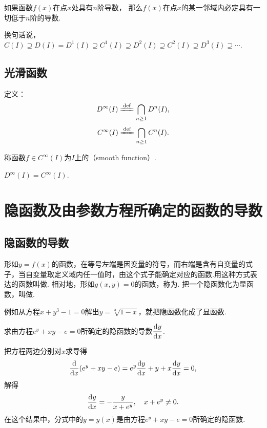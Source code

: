 \begin{theorem}
如果函数\(f(x)\)在点\(x\)处具有\(n\)阶导数，
那么\(f(x)\)在点\(x\)的某一邻域内必定具有一切低于\(n\)阶的导数.
\end{theorem}
换句话说，\(
C(I) \supseteq
D(I) = D^1(I) \supseteq
C^1(I) \supseteq
D^2(I) \supseteq
C^2(I) \supseteq
D^3(I) \supseteq
\dotsb
\).

\subsection{光滑函数}
\begin{definition}\label{definition:函数族.光滑函数族}
定义：\[
	D^\infty (I) \defeq \bigcap_{n\geq1} D^n(I),
\]\[
	C^\infty (I) \defeq \bigcap_{n\geq1} C^n(I).
\]

称函数\(f \in C^\infty (I)\)为\(I\)上的（smooth function）.
\end{definition}

\begin{property}\label{theorem:函数族.光滑函数族的性质1}
\(D^\infty (I) = C^\infty (I)\).
\end{property}

\section{隐函数及由参数方程所确定的函数的导数}\label{section:导数与微分.隐函数及由参数方程所确定的函数的导数}
\subsection{隐函数的导数}
\begin{definition}
形如\(y=f(x)\)的函数，在等号左端是因变量的符号，而右端是含有自变量的式子，当自变量取定义域内任一值时，由这个式子能确定对应的函数.用这种方式表达的函数叫做.
相对地，形如\(g(x,y)=0\)的函数，称为.
把一个隐函数化为显函数，叫做.
\end{definition}

\begin{example}
例如从方程\(x+y^3-1=0\)解出\(y=\sqrt[3]{1-x}\)，就把隐函数化成了显函数.
\end{example}

\begin{example}
求由方程\(e^y + xy - e = 0\)所确定的隐函数的导数\(\displaystyle\dv{y}{x}\).
\begin{solution}
把方程两边分别对\(x\)求导得\[
\dv{x}(e^y+xy-e) = e^y \dv{y}{x} + y + x \dv{y}{x} = 0,
\]解得\[
\dv{y}{x} = -\frac{y}{x+e^y},
\quad x+e^y \neq 0.
\]在这个结果中，分式中的\(y=y(x)\)是由方程\(e^y + xy - e = 0\)所确定的隐函数.
\end{solution}
\end{example}

